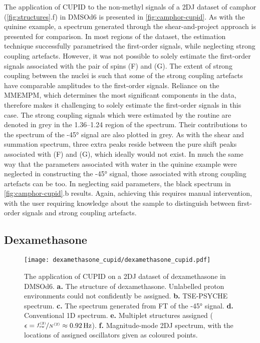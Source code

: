 The application of \ac{CUPID} to the non-methyl signals of a \ac{2DJ}
dataset of camphor (\cref{fig:structures}.f) in \acs{DMSOd6} is presented
in \cref{fig:camphor-cupid}. As with the quinine example, a spectrum
generated through the shear-and-project approach is presented for
comparison. In most regions of the dataset, the estimation technique
successfully parametrised the first-order signals, while neglecting strong
coupling artefacts. However, it was not possible to solely estimate the
first-order signals associated with the pair of spins (F) and (G). The extent
of strong coupling between the nuclei is such that some of the strong coupling
artefacts have comparable amplitudes to the first-order signals. Reliance on
the
\ac{MMEMPM}, which determines the most significant components in
the data, therefore makes it challenging to solely estimate the first-order
signals in this case. The strong coupling signals which were estimated by the
routine are denoted in grey in the \SIrange{1.36}{1.24}{\partspermillion} region
of the spectrum. Their contributions to the spectrum of the \ang{-45} signal
are also plotted in grey. As with the shear and summation spectrum, three extra
peaks reside between the pure shift peaks associated with (F) and (G), which
ideally would not exist. In much the same way that the parameters associated
with water in the quinine example were neglected in constructing the \ang{-45}
signal, those associated with strong coupling artefacts can be too.
In neglecting said parameters, the black spectrum in \cref{fig:camphor-cupid}.b
results. Again, achieving this requires manual intervention, with the user
requiring knowledge about the sample to distinguish between first-order signals
and strong coupling artefacts.

\subsection{Dexamethasone}
\begin{figure}%
    \centering%
    \texttt{[image: dexamethasone\_cupid/dexamethasone\_cupid.pdf]}%
    \caption[
        The application of \acs{CUPID} on a dexamethasone \acs{2DJ} dataset.
    ]{
        The application of \acs{CUPID} on a \ac{2DJ} dataset of dexamethasone in
        \acs{DMSOd6}.
        \textbf{a.} The structure of dexamethasone. Unlabelled proton
        environments could not confidently be assigned.
        \textbf{b.} \acs{TSE-PSYCHE} spectrum.
        \textbf{c.} The spectrum generated from \ac{FT} of the \ang{-45}
        signal.
        \textbf{d.} Conventional \acs{1D} spectrum.
        \textbf{e.} Multiplet structures assigned ($\epsilon =
        \nicefrac{\fswtwo}{\Ntwo} \approx \qty{0.92}{\hertz}$).
        \textbf{f.} Magnitude-mode \acs{2DJ} spectrum, with the locations of
        assigned oscillators given as coloured points.
    }
    \label{fig:dexamethasone-cupid}%
\end{figure}%

